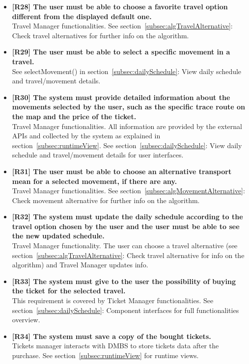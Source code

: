 \begin{itemize}
\item \textbf{[R28] The user must be able to choose a favorite travel option different from the displayed default one.}\\
Travel Manager functionalities. See section~\ref{subsec:algTravelAlternative}: Check travel alternatives for further info on the algorithm.

\item \textbf{[R29] The user must be able to select a specific movement in a travel.}\\
See selectMovement() in section~\ref{subsec:dailySchedule}: View daily schedule and travel/movement details.

\item \textbf{[R30] The system must provide detailed information about the movements selected by the user,
such as the specific trace route on the map and the price of the ticket.}\\
Travel Manager functionalities. All information are provided by the external APIs and collected by the system as explained in section~\ref{subsec:runtimeView}. See section~\ref{subsec:dailySchedule}: View daily schedule and travel/movement details for user interfaces.

\item \textbf{[R31] The user must be able to choose an alternative transport mean for a selected movement, if
there are any.}\\
Travel Manager functionalities. See section~\ref{subsec:algMovementAlternative}: Check movement alternative for further info on the algorithm.

\item \textbf{[R32] The system must update the daily schedule according to the travel option chosen by the user and the user must be able to see the new updated schedule.}\\
Travel Manager functionality. The user can choose a travel alternative (see section~\ref{subsec:algTravelAlternative}: Check travel alternative for info on the algorithm) and Travel Manager updates info.

\item \textbf{[R33] The system must give to the user the possibility of buying the ticket for the selected travel.}\\
This requirement is covered by Ticket Manager functionalities. See section~\ref{subsec:dailySchedule}: Component interfaces for full functionalities overview.

\item \textbf{[R34] The system must save a copy of the bought tickets.}\\
Tickets manager interacts with DMBS to store tickets data after the purchase. See section~\ref{subsec:runtimeView} for runtime views.


\end{itemize}
